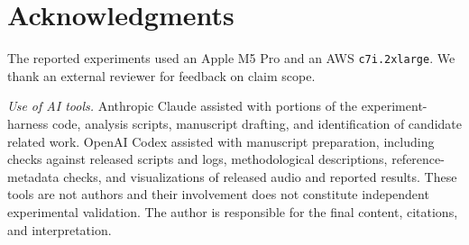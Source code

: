 \documentclass[11pt,a4paper]{article}
\begin{document}
\section*{Acknowledgments}
The reported experiments used an Apple M5 Pro and an AWS \texttt{c7i.2xlarge}. We thank an external reviewer for feedback on claim scope.

\emph{Use of AI tools.} Anthropic Claude assisted with portions of the experiment-harness code, analysis scripts, manuscript drafting, and identification of candidate related work. OpenAI Codex assisted with manuscript preparation, including checks against released scripts and logs, methodological descriptions, reference-metadata checks, and visualizations of released audio and reported results. These tools are not authors and their involvement does not constitute independent experimental validation. The author is responsible for the final content, citations, and interpretation.
\end{document}
